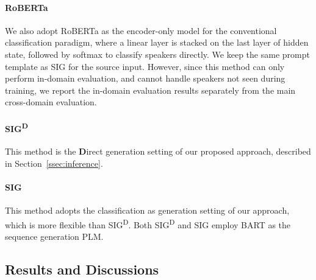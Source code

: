 \documentclass[letterpaper]{article} %
\begin{document}
\paragraph{RoBERTa}
We also adopt RoBERTa \cite{DBLP:journals/corr/abs-1907-11692} as the encoder-only model for the conventional classification paradigm, where a linear layer is stacked on the last layer of hidden state, followed by softmax to classify speakers directly.
We keep the same prompt template as SIG for the source input.
However, since this method can only perform in-domain evaluation, and cannot handle speakers not seen during training, we report the in-domain evaluation results separately from the main cross-domain evaluation.

\paragraph{SIG\textsuperscript{D}}
This method is the \textbf{D}irect generation setting of our proposed approach, described in Section~\ref{ssec:inference}.

\paragraph{SIG}
This method adopts the classification as generation setting of our approach, which is more flexible than SIG\textsuperscript{D}. Both SIG\textsuperscript{D} and SIG employ BART \cite{lewis-etal-2020-bart} as the sequence generation PLM.

\subsection{Results and Discussions}
\end{document}

